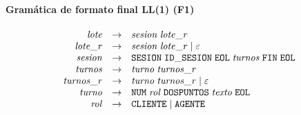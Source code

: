 \paragraph{Gramática de formato final LL(1) (F1)}
\[
\begin{array}{rcl}
  \mathit{lote} & \to & \mathit{sesion}\;\mathit{lote\_r} \\
  \mathit{lote\_r} & \to & \mathit{sesion}\;\mathit{lote\_r} \mid \varepsilon \\
  \mathit{sesion} & \to & \mathtt{SESION}\;\mathtt{ID\_SESION}\;\mathtt{EOL}\;\mathit{turnos}\;\mathtt{FIN}\;\mathtt{EOL} \\
  \mathit{turnos} & \to & \mathit{turno}\;\mathit{turnos\_r} \\
  \mathit{turnos\_r} & \to & \mathit{turno}\;\mathit{turnos\_r} \mid \varepsilon \\
  \mathit{turno} & \to & \mathtt{NUM}\;\mathit{rol}\;\mathtt{DOSPUNTOS}\;\mathit{texto}\;\mathtt{EOL} \\
  \mathit{rol} & \to & \mathtt{CLIENTE} \mid \mathtt{AGENTE} \\
\end{array}
\]

